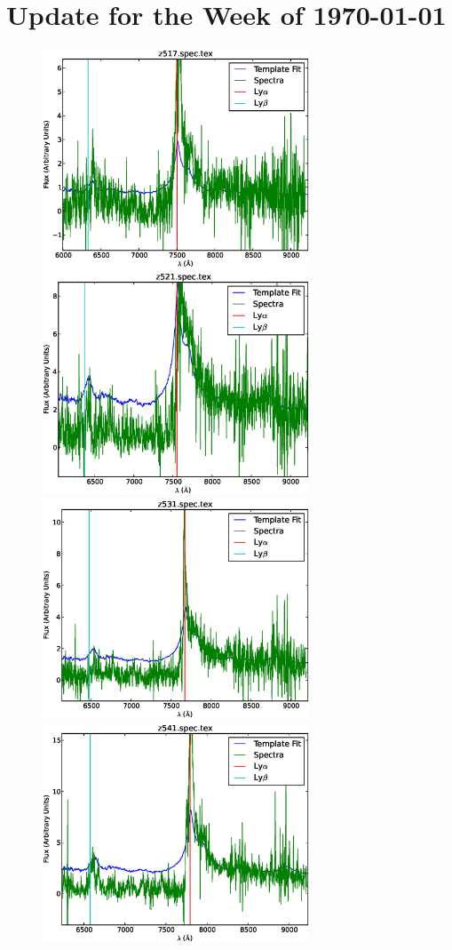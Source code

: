 \documentclass[11pt]{article}
\begin{document}
\section*{Update for the Week of \today}

\begin{figure}[h]
  \centering
  \includegraphics[width=8cm]{z517.spec.eps}
  \includegraphics[width=8cm]{z521.spec.eps}
  \includegraphics[width=8cm]{z531.spec.eps}
  \includegraphics[width=8cm]{z541.spec.eps}

\end{figure}
\end{document}
